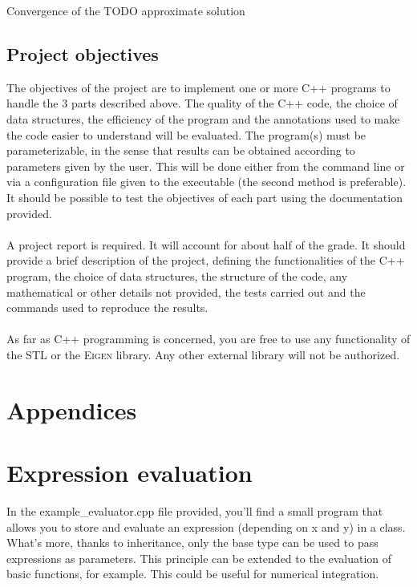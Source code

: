 \documentclass[english,10pt,a4paper]{article}
\begin{document}
Convergence of the TODO approximate solution


\subsection{Project objectives}
The objectives of the project are to implement one or more C++ programs to handle the 3 parts described above.
The quality of the C++ code, the choice of data structures, the efficiency of the program and the annotations used to make the code easier to understand will be evaluated.
The program(s) must be parameterizable, in the sense that results can be obtained according to parameters given by the user.
This will be done either from the command line or via a configuration file given to the executable (the second method is preferable).
It should be possible to test the objectives of each part using the documentation provided.

\paragraph{}
A project report is required. It will account for about half of the grade. It should provide a brief description of the project, defining the functionalities of the C++ program,
the choice of data structures, the structure of the code, any mathematical or other details not provided, the tests carried out and the commands used to reproduce the results.

\paragraph{}
As far as C++ programming is concerned, you are free to use any functionality of the STL or the \textsc{Eigen} library. Any other external library will not be authorized.


\section*{Appendices}

\section*{Expression evaluation}
In the example\_evaluator.cpp file provided, you'll find a small program that allows you to store and evaluate an expression (depending on x and y) in a class.
What's more, thanks to inheritance, only the base type can be used to pass expressions as parameters.
This principle can be extended to the evaluation of basic functions, for example.
This could be useful for numerical integration.
\end{document}
